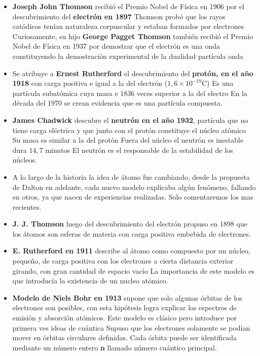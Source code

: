 \begin{itemize}
\item \textbf{Joseph John Thomson} recibió el Premio Nobel de Física en 1906 por el descubrimiento del \textbf{electrón en 1897} Thomson probó que los rayos catódicos tenían naturaleza corpuscular y estaban formados por electrones Curiosamente, su hijo \textbf{George Pagget Thomson} también recibió el Premio Nobel de Física en 1937 por demostrar que el electrón es una onda constituyendo la demostración experimental de la dualidad partícula onda

\item Se atribuye a \textbf{Ernest Rutherford} el descubrimiento del \textbf{protón, en el año 1918} con carga positiva e igual a la del electrón ($1,6\times 10^{-19}$C) Es una partícula subatómica cuya masa e 1836 veces superior a la del electro En la década del 1970 se crean evidencia que es una partícula compuesta.

\item \textbf{James Chadwick} descubre el \textbf{neutrón en el año 1932}, partícula que no tiene carga eléctrica y que junto con el protón constituye el núcleo atómico Su masa es similar a la del protón Fuera del núcleo el neutrón es inestable dura $14,7$ minutos El neutrón es el responsable de la estabilidad de los núcleos.

\item A lo largo de la historia la idea de átomo fue cambiando, desde la propuesta de Dalton en adelante, cada nuevo modelo explicaba algún fenómeno, fallando en otros, ya que nacen de experiencias realizadas. Solo comentaremos los mas recientes.

\item \textbf{J. J. Thomson} luego del descubrimiento del electrón propuso en 1898 que los átomos son esferas de materia con carga positiva embebida de electrones.

\item \textbf{E. Rutherford en 1911} describe al átomo como compuesto por un núcleo, pequeño, de carga positiva con los electrones a cierta distancia exterior
girando, con gran cantidad de espacio vacío La importancia de este modelo es que introducía la existencia de un nucleo atómico.

\item \textbf{Modelo de Niels Bohr en 1913} supone que solo algunas órbitas de los electrones son posibles, con esta hipótesis logra explicar los espectros de emisión y absorción atómicos. Este modelo es clásico pero introduce por primera ves ideas de cuántica Supuso que los electrones solamente se podían mover en órbitas circulares definidas. Cada órbita puede ser identificada mediante un número entero \textbf{n} llamado número cuántico principal.


\end{itemize}

